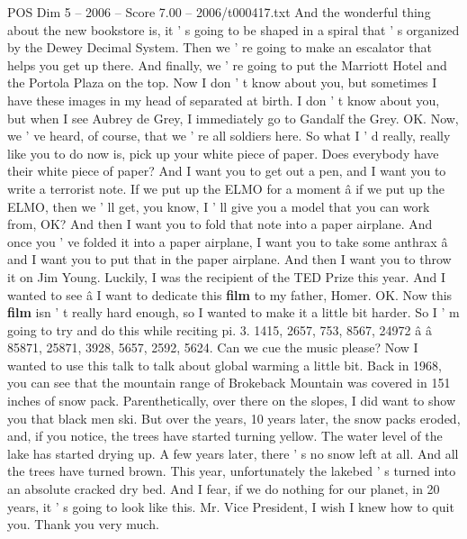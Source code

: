 \begin{textsample}{POS Dim 5 – 2006 – Score 7.00 – 2006/t000417.txt}
And the wonderful thing about the new bookstore is, it ' s going to be shaped in a spiral that ' s organized by the Dewey Decimal System.
Then we ' re going to make an escalator that helps you get up there.
And finally, we ' re going to put the Marriott Hotel and the Portola Plaza on the top.
Now I don ' t know about you, but sometimes I have these images in my head of separated at birth.
I don ' t know about you, but when I see Aubrey de Grey, I immediately go to Gandalf the Grey.
OK.
Now, we ' ve heard, of course, that we ' re all soldiers here.
So what I ' d really, really like you to do now is, pick up your white piece of paper.
Does everybody have their white piece of paper?
And I want you to get out a pen, and I want you to write a terrorist note.
If we put up the ELMO for a moment â if we put up the ELMO, then we ' ll get, you know, I ' ll give you a model that you can work from, OK?
And then I want you to fold that note into a paper airplane.
And once you ' ve folded it into a paper airplane, I want you to take some anthrax â and I want you to put that in the paper airplane.
And then I want you to throw it on Jim Young.
Luckily, I was the recipient of the TED Prize this year.
And I wanted to see â I want to dedicate this \textbf{film} to my father, Homer.
OK.
Now this \textbf{film} isn ' t really hard enough, so I wanted to make it a little bit harder.
So I ' m going to try and do this while reciting pi. 3. 1415, 2657, 753, 8567, 24972 â â 85871, 25871, 3928, 5657, 2592, 5624.
Can we cue the music please?
Now I wanted to use this talk to talk about global warming a little bit.
Back in 1968, you can see that the mountain range of Brokeback Mountain was covered in 151 inches of snow pack.
Parenthetically, over there on the slopes, I did want to show you that black men ski.
But over the years, 10 years later, the snow packs eroded, and, if you notice, the trees have started turning yellow.
The water level of the lake has started drying up.
A few years later, there ' s no snow left at all.
And all the trees have turned brown.
This year, unfortunately the lakebed ' s turned into an absolute cracked dry bed.
And I fear, if we do nothing for our planet, in 20 years, it ' s going to look like this.
Mr.
Vice President, I wish I knew how to quit you.
Thank you very much.

\end{textsample}
